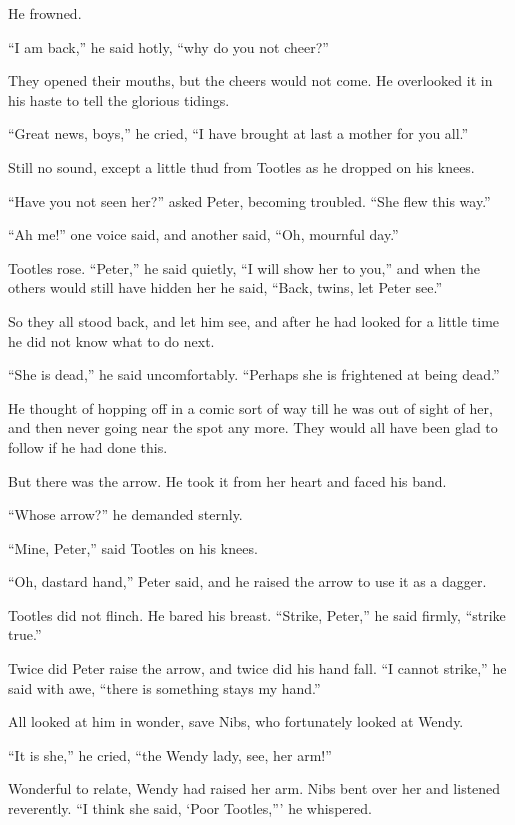 He frowned.

``I am back,'' he said hotly, ``why do you not cheer?''

They opened their mouths, but the cheers would not come. He overlooked
it in his haste to tell the glorious tidings.

``Great news, boys,'' he cried, ``I have brought at last a mother for you
all.''

Still no sound, except a little thud from Tootles as he dropped on his
knees.

``Have you not seen her?'' asked Peter, becoming troubled. ``She flew this
way.''

``Ah me!'' one voice said, and another said, ``Oh, mournful day.''

Tootles rose. ``Peter,'' he said quietly, ``I will show her to you,'' and
when the others would still have hidden her he said, ``Back, twins, let
Peter see.''

So they all stood back, and let him see, and after he had looked for a
little time he did not know what to do next.

``She is dead,'' he said uncomfortably. ``Perhaps she is frightened at
being dead.''

He thought of hopping off in a comic sort of way till he was out of
sight of her, and then never going near the spot any more. They would
all have been glad to follow if he had done this.

But there was the arrow. He took it from her heart and faced his band.

``Whose arrow?'' he demanded sternly.

``Mine, Peter,'' said Tootles on his knees.

``Oh, dastard hand,'' Peter said, and he raised the arrow to use it as a
dagger.

Tootles did not flinch. He bared his breast. ``Strike, Peter,'' he said
firmly, ``strike true.''

Twice did Peter raise the arrow, and twice did his hand fall. ``I cannot
strike,'' he said with awe, ``there is something stays my hand.''

All looked at him in wonder, save Nibs, who fortunately looked at
Wendy.

``It is she,'' he cried, ``the Wendy lady, see, her arm!''

Wonderful to relate, Wendy had raised her arm. Nibs bent over her and
listened reverently. ``I think she said, ‘Poor Tootles,''' he whispered.

